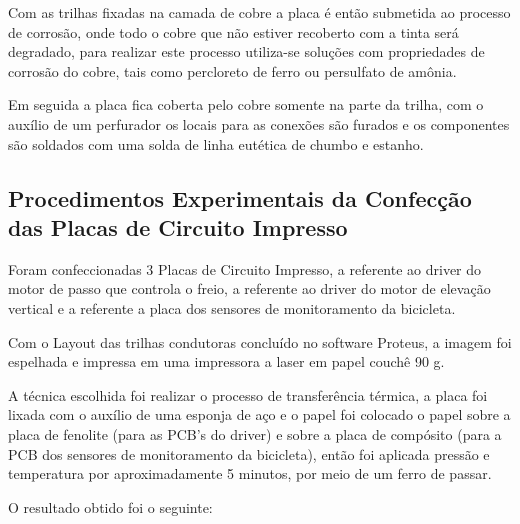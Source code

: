 Com as trilhas fixadas na camada de cobre a placa é então submetida ao processo de corrosão, onde todo o cobre que não estiver recoberto com a tinta será degradado, para realizar este processo utiliza-se soluções com propriedades de corrosão do cobre, tais como percloreto de ferro ou persulfato de amônia.   

Em seguida a placa fica coberta pelo cobre somente na parte da trilha, com o auxílio de um perfurador os locais para as conexões são furados e os componentes são soldados com uma solda de linha eutética de chumbo e estanho. 

\subsection{Procedimentos Experimentais da Confecção das Placas de Circuito Impresso}

Foram confeccionadas 3 Placas de Circuito Impresso, a referente ao driver do motor de passo que controla o freio, a referente ao driver do motor de elevação vertical e a referente a placa dos sensores de monitoramento da bicicleta. 

Com o Layout das trilhas condutoras concluído no software Proteus, a imagem foi espelhada e impressa em uma impressora a laser em papel couchê 90 g. 

A técnica escolhida foi realizar o processo de transferência térmica, a placa foi lixada com o auxílio de uma esponja de aço e o papel foi colocado o papel sobre a placa de fenolite (para as PCB’s do driver) e sobre a placa de compósito (para a PCB dos sensores de monitoramento da bicicleta), então foi aplicada pressão e temperatura por aproximadamente 5 minutos, por meio de um ferro de passar.

O resultado obtido foi o seguinte: 

